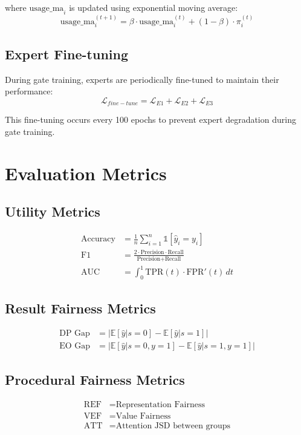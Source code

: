 \documentclass[11pt]{article}
\begin{document}
where $\text{usage\_ma}_i$ is updated using exponential moving average:
\begin{equation}
    \text{usage\_ma}_i^{(t+1)} = \beta \cdot \text{usage\_ma}_i^{(t)} + (1-\beta) \cdot \pi_i^{(t)}
\end{equation}

\subsection{Expert Fine-tuning}
During gate training, experts are periodically fine-tuned to maintain their performance:
\begin{equation}
    \mathcal{L}_{fine-tune} = \mathcal{L}_{E1} + \mathcal{L}_{E2} + \mathcal{L}_{E3}
\end{equation}

This fine-tuning occurs every 100 epochs to prevent expert degradation during gate training.

\section{Evaluation Metrics}

\subsection{Utility Metrics}
\begin{align}
    \text{Accuracy} &= \frac{1}{n} \sum_{i=1}^n \mathbb{1}[\hat{y}_i = y_i] \\
    \text{F1} &= \frac{2 \cdot \text{Precision} \cdot \text{Recall}}{\text{Precision} + \text{Recall}} \\
    \text{AUC} &= \int_0^1 \text{TPR}(t) \cdot \text{FPR}'(t) \, dt
\end{align}

\subsection{Result Fairness Metrics}
\begin{align}
    \text{DP Gap} &= \left| \mathbb{E}[\hat{y}|s=0] - \mathbb{E}[\hat{y}|s=1] \right| \\
    \text{EO Gap} &= \left| \mathbb{E}[\hat{y}|s=0, y=1] - \mathbb{E}[\hat{y}|s=1, y=1] \right|
\end{align}

\subsection{Procedural Fairness Metrics}
\begin{align}
    \text{REF} &= \text{Representation Fairness} \\
    \text{VEF} &= \text{Value Fairness} \\
    \text{ATT} &= \text{Attention JSD between groups}
\end{align}
\end{document}
